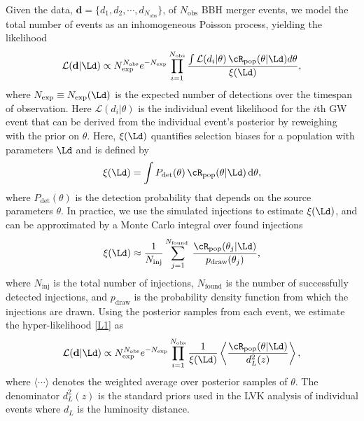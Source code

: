 \documentclass[
reprint,           %
superscriptaddress,%
amsmath,           %
amssymb,           %
aps,               %
prd,               %
notitlepage,       %
longbibliography,  %
floatfix,          %
nofootinbib,
]{revtex4-1}
\def\e{\begin{equation}}
\def\q{\end{equation}}
\begin{document}
Given the data, $\textbf{d} = \{d_1, d_2, \cdots, d_{N_{\mathrm{obs}}}\}$, of $N_{\mathrm{obs}}$ BBH merger events, we model the total number of events as an inhomogeneous Poisson process, yielding the likelihood \cite{Loredo:2004nn,Thrane:2018qnx,Mandel:2018mve}
\begin{equation}\label{L1}
	\mathcal{L}(\textbf{d}|\Ld) \propto N_{\mathrm{exp}}^{N_{\mathrm{obs}}} e^{-N_{\mathrm{exp}}} \prod_{i=1}^{N_{\mathrm{obs}}} \frac{\int \mathcal{L} (d_{i}| \theta)\, \cR_{\mathrm{pop}}(\theta|\Ld) d \theta}{\xi(\Ld)},
\end{equation}
where $N_{\exp}\equiv N_{\exp}(\Ld)$ is the expected number of detections over the timespan of observation. Here $\mathcal{L} (d_{i}|\theta)$ is the individual event likelihood for the $i$th GW event that can be derived from the individual event's posterior by reweighing with the prior on $\theta$. Here, $\xi(\Ld)$ quantifies selection biases for a population with parameters $\Ld$ and is defined by
\e\label{xi}
\xi(\Ld) = \int P_{\mathrm{det}}(\theta)\, \cR_{\mathrm{pop}}(\theta|\Ld)\, \mathrm{d} \theta,
\q
where $P_{\text{det}}(\theta)$ is the detection probability that depends on the source parameters $\theta$.
In practice, we use the simulated injections \cite{ligo_scientific_collaboration_and_virgo_2021_5546676} to estimate $\xi(\Ld)$, and  can be approximated by a Monte Carlo integral over found injections \cite{KAGRA:2021duu}
\begin{equation}
	\xi(\Ld) \approx \frac{1}{N_{\mathrm{inj}}} \sum_{j=1}^{N_{\text {found }}} \frac{\cR_{\mathrm{pop}}(\theta_{j} | \Ld)}{p_{\mathrm{draw}}(\theta_j)},
\end{equation}
where $N_{\text{inj}}$ is the total number of injections, $N_{\text{found}}$ is the number of successfully detected injections, and $p_{\mathrm{draw}}$ is the probability density function from which the injections are drawn.
Using the posterior samples from each event, we estimate the hyper-likelihood \eqref{L1} as
\begin{equation}\label{L2}
	\mathcal{L}(\textbf{d}|\Ld) \propto N_{\mathrm{exp}}^{N_{\mathrm{obs}}} e^{-N_{\mathrm{exp}}} \prod_{i=1}^{N_{\mathrm{obs}}} \frac{1}{\xi(\Ld)} \left\langle \frac{\cR_{\mathrm{pop}}(\theta|\Ld)}{d_L^2(z)} \right\rangle,
\end{equation}
where $\langle\cdots\rangle$ denotes the weighted average over posterior samples of $\theta$. The denominator $d_L^2(z)$ is the standard priors used in the LVK analysis of individual events where $d_L$ is the luminosity distance.
\end{document}
